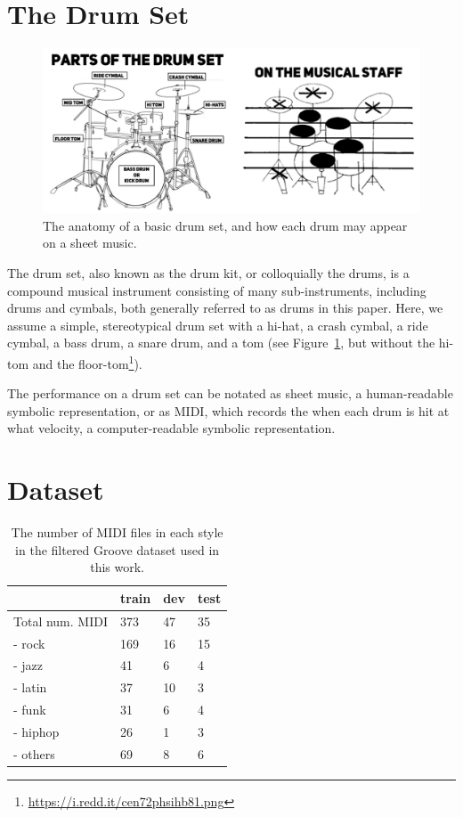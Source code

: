 \documentclass[letterpaper]{article} %
\begin{document}
\section{The Drum Set}
\begin{figure}[t!]
    \centering
    \includegraphics[scale=0.53]{images/drumset-resized.png}
    \caption{The anatomy of a basic drum set, and how each drum may appear on a sheet music.}
    \label{fig:drumset}
\end{figure}

The drum set, also known as the drum kit, or colloquially the drums, is a compound musical instrument consisting of many sub-instruments, including drums and cymbals, both generally referred to as drums in this paper. Here, we assume a simple, stereotypical drum set with a hi-hat, a crash cymbal, a ride cymbal, a bass drum, a snare drum, and a tom (see Figure~\ref{fig:drumset}, but without the hi-tom and the floor-tom\footnote{\url{https://i.redd.it/cen72phsihb81.png}}).

The performance on a drum set can be notated as sheet music, a human-readable symbolic representation, or as MIDI, which records the when each drum is hit at what velocity, a computer-readable symbolic representation.

\section{Dataset}
\begin{table}[t!]
\centering
\begin{tabular}{llll}
\toprule
            & train & dev & test \\ \midrule
Total num. MIDI   & 373   & 47  & 35   \\
- rock &   169    &  16   &  15    \\
- jazz &   41    &  6   &   4   \\
- latin &   37    &  10   &  3    \\
- funk &    31   &  6   &   4   \\
- hiphop &   26    &  1   &    3  \\
- others &   69    &  8   &   6   \\
\bottomrule
\end{tabular}
\caption{The number of MIDI files in each style in the filtered Groove dataset used in this work.}
\label{fig:dataset_stats}
\end{table}
\end{document}
